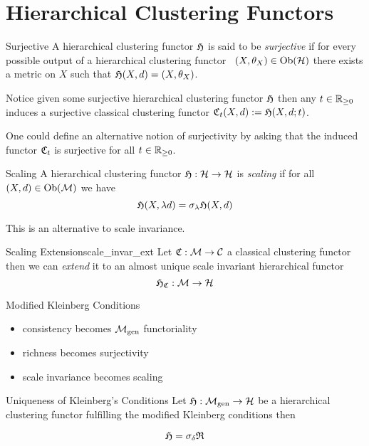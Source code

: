 \chapter{Hierarchical Clustering Functors}

\begin{definition}{Surjective}{}
    A hierarchical clustering functor $\mathfrak{H}$ is said to be \emph{surjective} if for every possible output of a hierarchical clustering functor \ie\ $(X, \theta_X) \in \mathrm {Ob}(\mathcal{H})$ there exists a metric on $X$ such that $\mathfrak{H}(X,d) = (X, \theta_X)$.
\end{definition}

Notice given some surjective hierarchical clustering functor $\mathfrak{H}$ then any $t \in \mathbb R_{\geq0}$ induces a surjective classical clustering functor $\mathfrak{C}_t(X,d) := \mathfrak{H}(X, d; t)$.


One could define an alternative notion of surjectivity by asking that the induced functor $\mathfrak{C}_t$ is surjective for all $t \in \mathbb R_{\geq0}$.

\begin{definition}{Scaling}{}
A hierarchical clustering functor $\mathfrak{H}: \mathcal{H} \to \mathcal{H}$ is \emph{scaling} if for all $(X,d) \in \mathrm {Ob}(\mathcal{M})$ we have
$$
\mathfrak{H}(X, \lambda d) = \sigma_\lambda \mathfrak{H}(X,d)
$$
\end{definition}
This is an alternative to scale invariance.


\begin{definition}{Scaling Extension}{scale_invar_ext}
Let $\mathfrak{C}: \mathcal{M} \to \mathcal{C}$ a classical clustering functor then we can \emph{extend} it to an almost unique scale invariant hierarchical functor
$$
\mathfrak{H}_{\mathfrak{C}}: \mathcal{M} \to \mathcal{H}
$$
\end{definition}


\begin{myremark}{Modified Kleinberg Conditions}{}
    \cite[Comment~7.3.1]{Carlsson2010}


    \begin{itemize}
        \item consistency becomes ${\mathcal{M}_\mathrm{gen}}$ functoriality
        \item richness becomes surjectivity
        \item scale invariance becomes scaling
    \end{itemize}
\end{myremark}

\begin{theorem}{Uniqueness of Kleinberg's Conditions}{}
    Let $\mathfrak{H}: {\mathcal{M}_\mathrm{gen}} \to \mathcal{H}$ be a hierarchical clustering functor fulfilling the modified Kleinberg conditions then

    $$
    \mathfrak{H} = \sigma_\delta \mathfrak{R}
    $$

\end{theorem}

